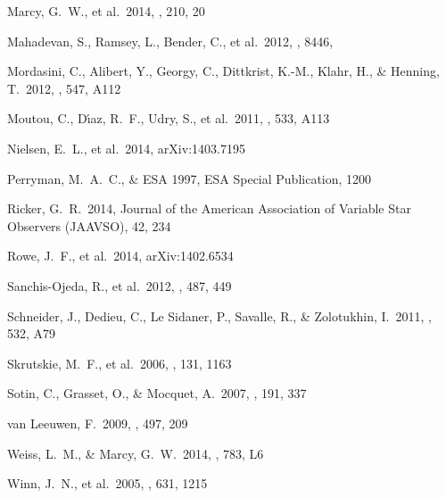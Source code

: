 \documentclass[11pt,preprint]{aastex}
\begin{document}
\begin{CJK*}{UTF8}{gbsn}
\begin{thebibliography}
 Marcy, G.~W., et al.\ 2014, \apjs, 
210, 20 %

 Mahadevan, S., 
Ramsey, L., Bender, C., et al.\ 2012, \procspie, 8446, %

 Mordasini, C., Alibert, Y., 
Georgy, C., Dittkrist, K.-M., Klahr, H., \& Henning, T.\ 2012, \aap, 547, A112

 Moutou, C., D{\'{\i}}az, R.~F., Udry, S., et al.\ 2011, \aap, 533, A113  %

 Nielsen, E.~L., et al.\ 2014, 
arXiv:1403.7195 %
  
 Perryman, M.~A.~C., \&
  ESA 1997, ESA Special Publication, 1200 %

 Ricker, G.~R.\ 2014, Journal of the 
American Association of Variable Star Observers (JAAVSO), 42, 234 %

 Rowe, J.~F., et al.\ 2014, 
arXiv:1402.6534 %

 Sanchis-Ojeda, R., 
et al.\ 2012, \nat, 487, 449 %

 Schneider, J., Dedieu, C., 
Le Sidaner, P., Savalle, R., \& Zolotukhin, I.\ 2011, \aap, 532, A79

 Skrutskie, M.~F., et al.\ 
2006, \aj, 131, 1163 %

 Sotin, C., Grasset, O., 
\& Mocquet, A.\ 2007, \icarus, 191, 337 %

 van Leeuwen, F.\ 2009, \aap, 
497, 209 %

 Weiss, L.~M., \& Marcy,
  G.~W.\ 2014, \apjl, 783, L6  %

 Winn, J.~N., et al.\ 2005, \apj, 631, 
1215 %


\end{thebibliography}
\end{CJK*}
\end{document}
